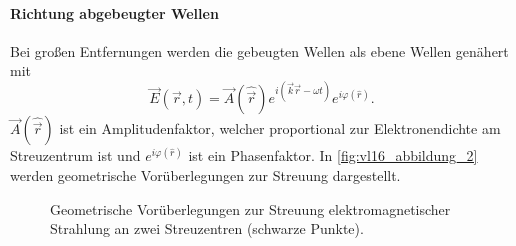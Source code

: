 \paragraph{Richtung abgebeugter Wellen}
	Bei gro{\ss}en Entfernungen werden die gebeugten Wellen als ebene Wellen genähert mit
	\begin{equation}
		\label{eq:II.3.11}
		\Vec{E} (\Vec{r}, t) = \Vec{A} (\hat{\Vec{r}}) e^{i (\Vec{k} \Vec{r} - \omega t)} e^{i \varphi (\hat{r})}.
	\end{equation}
	$\Vec{A} (\hat{\Vec{r}})$ ist ein Amplitudenfaktor, welcher proportional zur Elektronendichte am Streuzentrum ist und $e^{i \varphi(\hat{r})}$ ist ein Phasenfaktor.
	In \autoref{fig:vl16_abbildung_2} werden geometrische Vorüberlegungen zur Streuung dargestellt.

	\begin{figure}[H]
		\centering
		\caption{Geometrische Vorüberlegungen zur Streuung elektromagnetischer Strahlung an zwei Streuzentren (schwarze Punkte).}
		\label{fig:vl16_abbildung_2}
	\end{figure}

